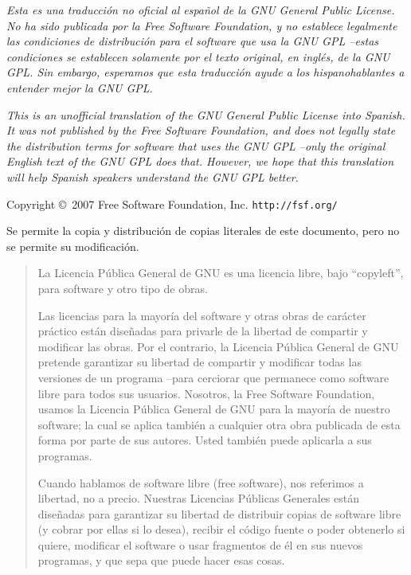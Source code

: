 {\footnotesize
{}
\textit{Esta es una traducci\'{o}n no oficial al espa\~nol de la GNU General Public License. No ha sido publicada por la Free Software Foundation, y no establece legalmente las condiciones de distribuci\'{o}n para el software que usa la GNU GPL --estas condiciones se establecen solamente por el texto original, en ingl\'{e}s, de la GNU GPL. Sin embargo, esperamos que esta traducci\'{o}n ayude a los hispanohablantes a entender mejor la GNU GPL. }

\vspace{0.4cm}

\textit{This is an unofficial translation of the GNU General Public License 
into Spanish. It was not published by the Free Software Foundation, and 
does not legally state the distribution terms for software that uses the 
GNU GPL --only the original English text of the GNU GPL does that. However, 
we hope that this translation will help Spanish speakers understand the 
GNU GPL better.}

\begin{center}
{\parindent 0in Copyright \copyright\  2007 Free Software Foundation, Inc. \texttt{http://fsf.org/}
  
 
\bigskip
Se permite la copia y distribuci\'{o}n de copias literales de este documento, pero no se permite su modificaci\'{o}n. }

\end{center}

\renewcommand{\abstractname}{Pre\'{a}mbulo}
\begin{abstract}
La Licencia P\'{u}blica General de GNU es una licencia libre, bajo ``copyleft'', para software y otro tipo de obras.

Las licencias para la mayor\'{i}a del software y otras obras de 
car\'{a}cter pr\'{a}ctico est\'{a}n dise\~nadas para privarle de la libertad 
de compartir y modificar las obras. Por el contrario, la Licencia P\'{u}blica General de GNU pretende garantizar su libertad de compartir y modificar 
todas las versiones de un programa --para cerciorar que permanece como 
software libre para todos sus usuarios. Nosotros, la Free Software Foundation, usamos la Licencia P\'{u}blica General de GNU para la mayor\'{i}a 
de nuestro software; la cual se aplica tambi\'{e}n a cualquier otra 
obra publicada de esta forma por parte de sus autores. Usted tambi\'{e}n 
puede aplicarla a sus programas.

Cuando hablamos de software libre (free software), nos referimos a libertad, no a precio. Nuestras Licencias P\'{u}blicas Generales est\'{a}n dise\~nadas para garantizar su libertad de distribuir copias de software libre (y cobrar por ellas si lo desea), recibir el c\'{o}digo fuente o poder obtenerlo si quiere, modificar el software o usar fragmentos de \'{e}l en sus nuevos programas, y que sepa que puede hacer esas cosas.


\end{abstract}}
